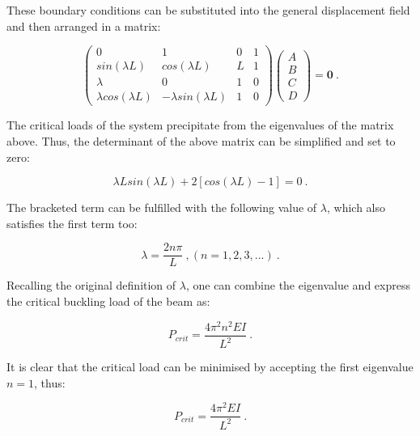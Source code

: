 These boundary conditions can be substituted into the general displacement field and then arranged in a matrix:

\begin{equation} 
\begin{pmatrix}
0 & 1 & 0 & 1 \\
sin(\lambda L) & cos(\lambda L) & L & 1\\
\lambda & 0 & 1 & 0 \\
\lambda cos(\lambda L) & -\lambda sin(\lambda L) & 1 & 0
\end{pmatrix}
\begin{pmatrix}
A \\
B \\
C \\
D
\end{pmatrix}
=
\mathbf{0}
\label{eqapp4_6}\ .
\end{equation}

The critical loads of the system precipitate from the eigenvalues of the matrix above. Thus, the determinant of the above matrix can be simplified and set to zero:

\begin{equation} 
\lambda L sin(\lambda L) + 2[cos(\lambda L) - 1] = 0
\label{eqapp4_7}\ .
\end{equation}

The bracketed term can be fulfilled with the following value of $\lambda$, which also satisfies the first term too:

\begin{equation} 
\lambda = \frac{2n\pi}{L}\ ,
(n = 1, 2, 3, ...)
\label{eqapp4_8}\ .
\end{equation}

Recalling the original definition of $\lambda$, one can combine the eigenvalue and express the critical buckling load of the beam as:

\begin{equation} 
P_{crit} = \frac{4\pi^2 n^2 EI}{L^2}
\label{eqapp4_9}\ .
\end{equation}

It is clear that the critical load can be minimised by accepting the first eigenvalue $n=1$, thus:

\begin{equation} 
P_{crit} = \frac{4\pi^2 EI}{L^2}
\label{eqapp4_10}\ .
\end{equation}